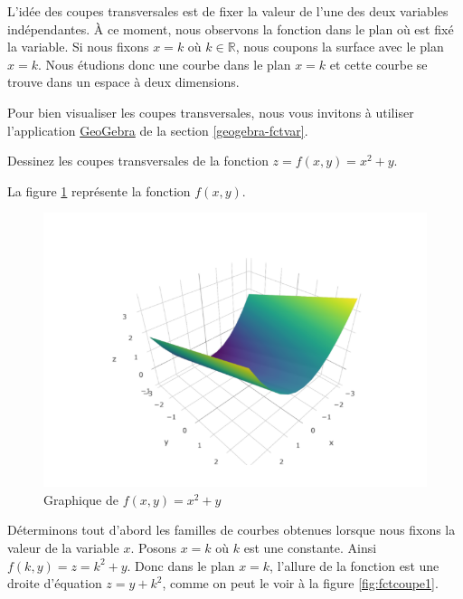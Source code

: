 \documentclass[]{book}
\theoremstyle{definition}
\theoremstyle{definition}
\theoremstyle{definition}
\theoremstyle{remark}
\let\BeginKnitrBlock\begin \let\EndKnitrBlock\end
\begin{document}
L'idée des coupes transversales est de fixer la valeur de l'une des deux
variables indépendantes. À ce moment, nous observons la fonction dans le
plan où est fixé la variable. Si nous fixons \(x=k\) où
\(k\in\mathbb{R}\), nous coupons la surface avec le plan \(x=k\). Nous
étudions donc une courbe dans le plan \(x=k\) et cette courbe se trouve
dans un espace à deux dimensions.

Pour bien visualiser les coupes transversales, nous vous invitons à
utiliser l'application
\href{https://www.geogebra.org/?lang=fr}{GeoGebra} de la section
\ref{geogebra-fctvar}.

\BeginKnitrBlock{example}
\protect\hypertarget{exm:unnamed-chunk-124}{}{\label{exm:unnamed-chunk-124}
}Dessinez les coupes transversales de la fonction \(z=f(x,y)=x^2+y\).
\EndKnitrBlock{example}

La figure \ref{fig:fctcoupe} représente la fonction \(f(x,y)\).

\begin{figure}

{\centering \includegraphics[width=0.8\linewidth]{resources/images/fct_coupe} 

}

\caption{Graphique de $f(x,y)=x^2+y$}\label{fig:fctcoupe}
\end{figure}

Déterminons tout d'abord les familles de courbes obtenues lorsque nous
fixons la valeur de la variable \(x\). Posons \(x=k\) où \(k\) est une
constante. Ainsi \(f(k,y)=z=k^2+y\). Donc dans le plan \(x=k\), l'allure
de la fonction est une droite d'équation \(z=y+k^2\), comme on peut le
voir à la figure \ref{fig:fctcoupe1}.
\end{document}
